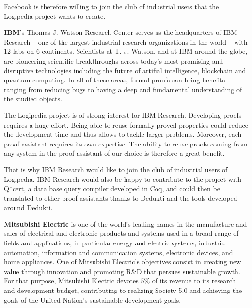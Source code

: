 Facebook is therefore willing to join the club of industrial users
that the Logipedia project wants to create.

{\bf IBM}'s Thomas J. Watson Research Center serves as the
headquarters of IBM Research -- one of the largest industrial research
organizations in the world -- with 12 labs on 6 continents. Scientists
at T. J. Watson, and at IBM around the globe, are pioneering
scientific breakthroughs across today's most promising and disruptive
technologies including the future of artifial intelligence, blockchain
and quantum computing. In all of these areas, formal proofs can bring
benefits ranging from reducing bugs to having a deep and fundamental
understanding of the studied objects.

The Logipedia project is of strong interest for IBM
Research. Developing proofs requires a huge effort. Being able to
reuse formally proved properties could reduce the development time and
thus allows to tackle larger problems. Moreover, each proof assistant
requires its own expertise. The ability to reuse proofs coming from
any system in the proof assistant of our choice is therefore a great
benefit.

That is why IBM Research would like to join the club of industrial
users of Logipedia. IBM Research would also be happy to contribute to
the project with Q*cert, a data base query compiler developed in Coq,
and could then be translated to other proof assistants thanks to
Dedukti and the tools developed around Dedukti.

{\bf Mitsubishi Electric} is one of the world's leading names in the
manufacture and sales of electrical and electronic products and
systems used in a broad range of fields and applications, in
particular energy and electric systems, industrial automation,
information and communication systems, electronic devices, and home
appliances. One of Mitsubishi Electric's objectives consist in
creating new value through innovation and promoting R\&D that persues
sustainable growth. For that purpose, Mitsubishi Electric devotes 5\%
of its revenue to its research and development budget, contributing to
realizing Society 5.0 and achieving the goals of the United Nation's
sustainable development goals.

